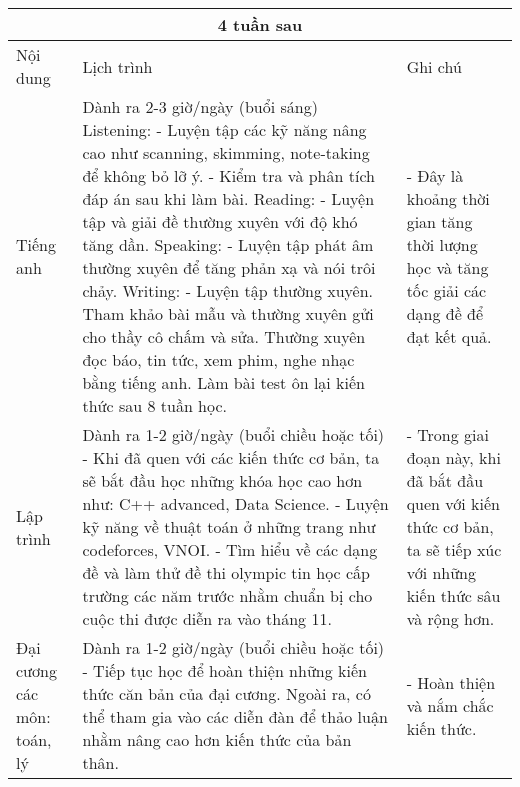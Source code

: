 \begin{center}
\begin{tabular}{ | m{2.5cm} | m{7.5cm}| m{7.5cm} |}
 \hline
 \multicolumn{3}{|c|}{4 tuần sau} \\
 \hline
  Nội dung & Lịch trình & Ghi chú \\ 
\hline
 Tiếng anh & Dành ra 2-3 giờ/ngày (buổi sáng) \newline Listening: \newline - Luyện tập các kỹ năng nâng cao như scanning, skimming, note-taking để không bỏ lỡ ý. \newline - Kiểm tra và phân tích đáp án sau khi làm bài. \newline Reading: \newline - Luyện tập và giải đề thường xuyên với độ khó tăng dần. \newline Speaking: \newline  - Luyện tập phát âm thường xuyên để tăng phản xạ và nói trôi chảy. \newline Writing: \newline - Luyện tập thường xuyên. \newline Tham khảo bài mẫu và thường xuyên gửi cho thầy cô chấm và sửa. \newline Thường xuyên đọc báo, tin tức, xem phim, nghe nhạc bằng tiếng anh. \newline Làm bài test ôn lại kiến thức sau 8 tuần học. & - Đây là khoảng thời gian tăng thời lượng học và tăng tốc giải các dạng đề để đạt kết quả.\\ 
 \hline
 Lập trình & Dành ra 1-2 giờ/ngày (buổi chiều hoặc tối) \newline - Khi đã quen với các kiến thức cơ bản, ta sẽ bắt đầu học những khóa học cao hơn như: C++ advanced, Data Science. \newline - Luyện kỹ năng về thuật toán ở những trang như codeforces, VNOI. \newline - Tìm hiểu về các dạng đề và làm thử đề thi olympic tin học cấp trường các năm trước nhằm chuẩn bị cho cuộc thi được diễn ra vào tháng 11. & - Trong giai đoạn này, khi đã bắt đầu quen với kiến thức cơ bản, ta sẽ tiếp xúc với những kiến thức sâu và rộng hơn. \\ 
 \hline
 Đại cương các môn: toán, lý& Dành ra 1-2 giờ/ngày (buổi chiều hoặc tối) \newline - Tiếp tục học để hoàn thiện những kiến thức căn bản của đại cương. Ngoài ra, có thể tham gia vào các diễn đàn để thảo luận nhằm nâng cao hơn kiến thức của bản thân. & - Hoàn thiện và nắm chắc kiến thức. \\ 

\end{tabular}
\end{center}
